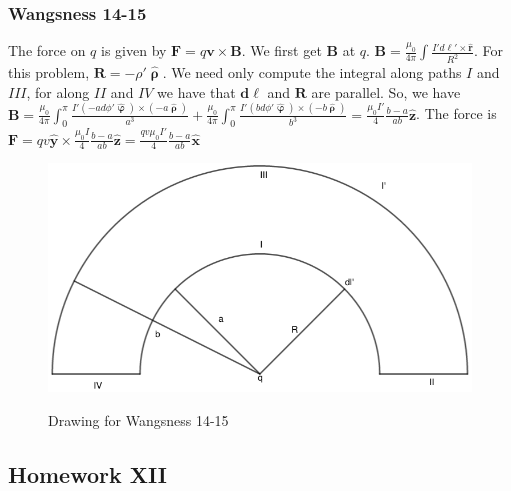 \documentclass{article}
\theoremstyle{mystyle}
\begin{document}
\subsubsection{Wangsness 14-15}
The force on $q$ is given by $\mathbf{F} = q\mathbf{v}\times \mathbf{B}$. We first get $\mathbf{B}$ at $q$. $\mathbf{B} = \frac{\mu_0}{4\pi} \int \frac{I' d\ell' \times \hat{\mathbf{r}}}{R^2}$. For this problem, $\mathbf{R} = -\rho' \hat{\boldsymbol{\uprho}}$. We need only compute the integral along paths $I$ and $III$, for along $II$ and $IV$ we have that $\mathbf{d\ell}$ and $\mathbf{R}$ are parallel. So, we have $\mathbf{B} = \frac{\mu_0}{4\pi} \int_{0}^{\pi} \frac{I'(-ad\phi' \hat{\boldsymbol{\upvarphi}})\times (-a\hat{\boldsymbol{\uprho}})}{a^3}+ \frac{\mu_0}{4\pi} \int_{0}^{\pi} \frac{I'(bd\phi' \hat{\boldsymbol{\upvarphi}})\times (-b\hat{\boldsymbol{\uprho}})}{b^3} = \frac{\mu_0 I'}{4} \frac{b-a}{ab} \hat{\mathbf{z}}$. The force is $\mathbf{F} = qv\hat{\mathbf{y}} \times \frac{\mu_0 I}{4} \frac{b-a}{ab} \hat{\mathbf{z}} = \frac{qv\mu_0 I'}{4} \frac{b-a}{ab} \hat{\mathbf{x}}$
\begin{figure}[htbp]
    \centering
    {\includegraphics[scale=0.4]{14-15.png}}
    \caption{Drawing for Wangsness 14-15}
\end{figure}
\subsection{Homework XII}
\end{document}
